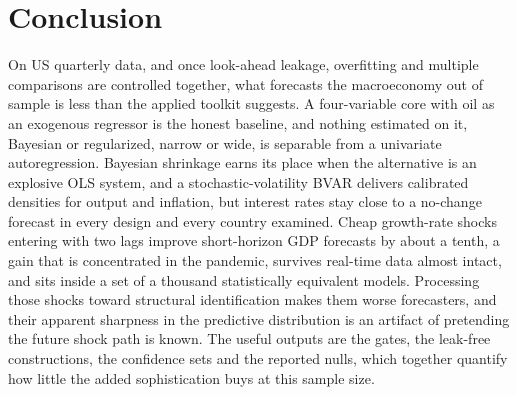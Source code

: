 \documentclass[conference]{IEEEtran}
\begin{document}
\section{Conclusion}
On US quarterly data, and once look-ahead leakage, overfitting and multiple comparisons are controlled together, what forecasts the macroeconomy out of sample is less than the applied toolkit suggests. A four-variable core with oil as an exogenous regressor is the honest baseline, and nothing estimated on it, Bayesian or regularized, narrow or wide, is separable from a univariate autoregression. Bayesian shrinkage earns its place when the alternative is an explosive OLS system, and a stochastic-volatility BVAR delivers calibrated densities for output and inflation, but interest rates stay close to a no-change forecast in every design and every country examined. Cheap growth-rate shocks entering with two lags improve short-horizon GDP forecasts by about a tenth, a gain that is concentrated in the pandemic, survives real-time data almost intact, and sits inside a set of a thousand statistically equivalent models. Processing those shocks toward structural identification makes them worse forecasters, and their apparent sharpness in the predictive distribution is an artifact of pretending the future shock path is known. The useful outputs are the gates, the leak-free constructions, the confidence sets and the reported nulls, which together quantify how little the added sophistication buys at this sample size.
\end{document}
